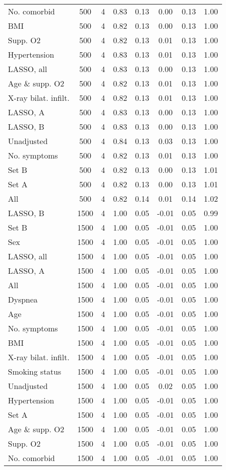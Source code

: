 \documentclass{article}
\begin{document}
\begin{table}[htpb]
{\begin{tabular}{lccccccc}
No. comorbid & 500 & 4 & 0.83 & 0.13 & 0.00 & 0.13 & 1.00\\
BMI & 500 & 4 & 0.82 & 0.13 & 0.00 & 0.13 & 1.00\\
Supp. O2 & 500 & 4 & 0.82 & 0.13 & 0.01 & 0.13 & 1.00\\
Hypertension & 500 & 4 & 0.83 & 0.13 & 0.01 & 0.13 & 1.00\\
LASSO, all & 500 & 4 & 0.83 & 0.13 & 0.00 & 0.13 & 1.00\\
Age \& supp. O2 & 500 & 4 & 0.82 & 0.13 & 0.01 & 0.13 & 1.00\\
X-ray bilat. infilt. & 500 & 4 & 0.82 & 0.13 & 0.01 & 0.13 & 1.00\\
LASSO, A & 500 & 4 & 0.83 & 0.13 & 0.00 & 0.13 & 1.00\\
LASSO, B & 500 & 4 & 0.83 & 0.13 & 0.00 & 0.13 & 1.00\\
Unadjusted & 500 & 4 & 0.84 & 0.13 & 0.03 & 0.13 & 1.00\\
No. symptoms & 500 & 4 & 0.82 & 0.13 & 0.01 & 0.13 & 1.00\\
Set B & 500 & 4 & 0.82 & 0.13 & 0.00 & 0.13 & 1.01\\
Set A & 500 & 4 & 0.82 & 0.13 & 0.00 & 0.13 & 1.01\\
All & 500 & 4 & 0.82 & 0.14 & 0.01 & 0.14 & 1.02\\ \midrule
LASSO, B & 1500 & 4 & 1.00 & 0.05 & -0.01 & 0.05 & 0.99\\
Set B & 1500 & 4 & 1.00 & 0.05 & -0.01 & 0.05 & 1.00\\
Sex & 1500 & 4 & 1.00 & 0.05 & -0.01 & 0.05 & 1.00\\
LASSO, all & 1500 & 4 & 1.00 & 0.05 & -0.01 & 0.05 & 1.00\\
LASSO, A & 1500 & 4 & 1.00 & 0.05 & -0.01 & 0.05 & 1.00\\
All & 1500 & 4 & 1.00 & 0.05 & -0.01 & 0.05 & 1.00\\
Dyspnea & 1500 & 4 & 1.00 & 0.05 & -0.01 & 0.05 & 1.00\\
Age & 1500 & 4 & 1.00 & 0.05 & -0.01 & 0.05 & 1.00\\
No. symptoms & 1500 & 4 & 1.00 & 0.05 & -0.01 & 0.05 & 1.00\\
BMI & 1500 & 4 & 1.00 & 0.05 & -0.01 & 0.05 & 1.00\\
X-ray bilat. infilt. & 1500 & 4 & 1.00 & 0.05 & -0.01 & 0.05 & 1.00\\
Smoking status & 1500 & 4 & 1.00 & 0.05 & -0.01 & 0.05 & 1.00\\
Unadjusted & 1500 & 4 & 1.00 & 0.05 & 0.02 & 0.05 & 1.00\\
Hypertension & 1500 & 4 & 1.00 & 0.05 & -0.01 & 0.05 & 1.00\\
Set A & 1500 & 4 & 1.00 & 0.05 & -0.01 & 0.05 & 1.00\\
Age \& supp. O2 & 1500 & 4 & 1.00 & 0.05 & -0.01 & 0.05 & 1.00\\
Supp. O2 & 1500 & 4 & 1.00 & 0.05 & -0.01 & 0.05 & 1.00\\
No. comorbid & 1500 & 4 & 1.00 & 0.05 & -0.01 & 0.05 & 1.00\\
\bottomrule
\hline
\end{tabular}}
\end{table}
\end{document}
